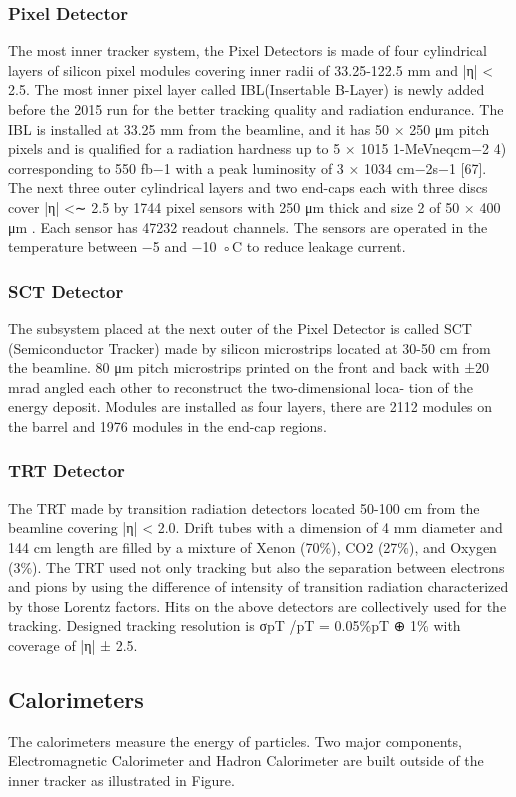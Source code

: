 \subsubsection{Pixel Detector}
The most inner tracker system, the Pixel Detectors is made of four cylindrical layers of silicon pixel modules covering inner radii of 33.25-122.5 mm and |η| < 2.5. The most inner pixel layer called IBL(Insertable B-Layer) is newly added before the 2015 run for the better tracking quality and radiation endurance. The IBL is installed at 33.25 mm from the beamline, and it has 50 × 250 μm pitch pixels and is qualified for a radiation hardness up to 5 × 1015 1-MeVneqcm−2 4) corresponding to 550 fb−1 with a peak luminosity of 3 × 1034 cm−2s−1 [67]. The next three outer cylindrical layers and
two end-caps each with three discs cover |η| <∼ 2.5 by 1744 pixel sensors with 250 μm thick and size 2 of 50 × 400 μm . Each sensor has 47232 readout channels. The sensors are operated in the temperature between −5 and −10 ◦C to reduce leakage current.
\subsubsection{SCT Detector}
The subsystem placed at the next outer of the Pixel Detector is called SCT (Semiconductor Tracker) made by silicon microstrips located at 30-50 cm from the beamline. 80 μm pitch microstrips printed on the front and back with ±20 mrad angled each other to reconstruct the two-dimensional loca- tion of the energy deposit. Modules are installed as four layers, there are 2112 modules on the barrel and 1976 modules in the end-cap regions.
\subsubsection{TRT Detector}
The TRT made by transition radiation detectors located 50-100 cm from the beamline covering |η| < 2.0. Drift tubes with a dimension of 4 mm diameter and 144 cm length are filled by a mixture of Xenon (70\%), CO2 (27\%), and Oxygen (3\%). The TRT used not only tracking but also the separation between electrons and pions by using the difference of intensity of transition radiation characterized by those Lorentz factors.
Hits on the above detectors are collectively used for the tracking. Designed tracking resolution is σpT /pT = 0.05\%pT ⊕ 1\% with coverage of |η| ± 2.5.
\subsection{Calorimeters}
The calorimeters measure the energy of particles. Two major components, Electromagnetic Calorimeter and Hadron Calorimeter are built outside of the inner tracker as illustrated in Figure.
